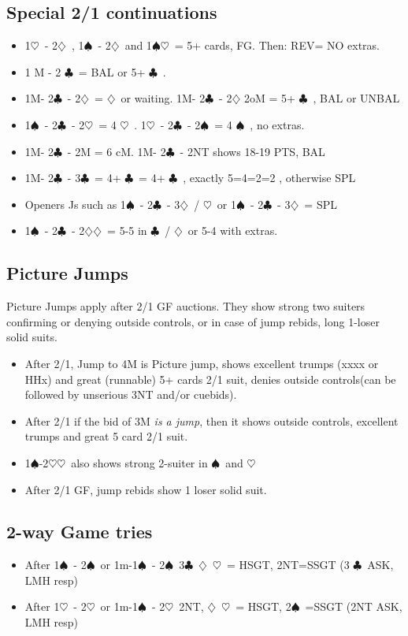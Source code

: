 \documentclass{article}
\newcommand\C{\ensuremath{\clubsuit}}
\newcommand\D{\ensuremath{\diamondsuit}}
\renewcommand\H{\ensuremath{\heartsuit}}
\renewcommand\S{\ensuremath{\spadesuit}}
\begin{document}
\begin{multicols}{2}
  \subsection{Special 2/1 continuations}
  \label{2over1}
  \begin{itemize}
    \item 1\H\ - 2\D\ ,  1\S\ - 2\D\ and 1\S{}\H\ = 5+ cards, FG. Then:  REV= NO extras.
    \item 1 M - 2 \C\ = BAL or 5+ \C\ .
    \item 1M- 2\C\ - 2\D\ = \D\ or waiting. 1M- 2\C\ - 2\D\- 2oM = 5+ \C\ , BAL or UNBAL
    \item 1\S\ - 2\C\ - 2\H\ = 4 \H\ . 1\H\ - 2\C\ - 2\S\ = 4 \S\ , no extras.
    \item 1M- 2\C\ - 2M = 6 cM. 1M- 2\C\ - 2NT shows 18-19 PTS, BAL
    \item 1M- 2\C\ - 3\C\ = 4+ \C\ = 4+ \C\ , exactly 5=4=2=2 , otherwise SPL
    \item Openers Js such as 1\S\ - 2\C\ - 3\D\ / \H\  or 1\S\ - 2\C\ - 3\D\ = SPL  
    \item 1\S\ - 2\C\ - 2\D{}\D\ = 5-5 in \C\ / \D\ or 5-4 with extras.
    \end{itemize}
    \subsection{Picture Jumps}
    \label{picture}
    Picture Jumps apply after 2/1 GF auctions. They show strong two suiters confirming or denying outside controls, or  in case of jump rebids, long 1-loser solid suits.
    \begin{itemize}
    \item After 2/1, Jump to 4M is Picture jump, shows excellent trumps (xxxx or HHx) and great (runnable) 5+ cards 2/1 suit, denies outside controls(can be followed by unserious 3NT and/or  cuebids).
    \item After 2/1 if the bid of 3M \emph{is a jump}, then it shows outside controls, excellent trumps and great 5 card 2/1 suit.
    \item 1\S-2\H{}\H\ also shows strong 2-suiter in \S\ and \H\
    \item After 2/1 GF, jump rebids show 1 loser solid suit. 
  \end{itemize}
  \subsection{2-way Game tries}
  \label{twgt}
  \begin{itemize}
    \item After 1\S\ - 2\S\ or 1m-1\S\ - 2\S\, 3\C\, \D\, \H\ = HSGT, 2NT=SSGT (3 \C\ ASK, LMH resp)
    \item After 1\H\ - 2\H\ or 1m-1\S\ - 2\H\, 2NT, \D\, \H\ = HSGT, 2\S\ =SSGT (2NT ASK, LMH resp)
\end{itemize}

\end{multicols}
\end{document}
